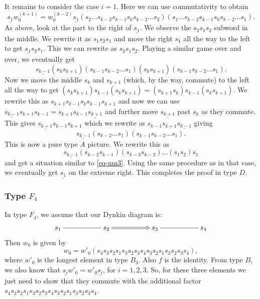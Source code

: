 \documentclass[a4paper]{amsart}
\begin{document}
It remains to consider the case $i=1$. Here we can use commutativity
to obtain 
\begin{displaymath}
\underline{s_1}w_0^{(k+1)}=
w_0^{(k-2)}\underline{s_{1}}
(s_2\dots 
s_{k-2}s_{k-1}s_ks_{k-2}\dots s_2)
(s_1\dots 
s_{k-2}s_{k-1}s_ks_{k-2}\dots s_1).
\end{displaymath}
As above, look at the part to the right of $\underline{s_{1}}$.
We observe the $s_2s_1s_2$ subword in the middle.
We rewrite it as $s_1s_2s_1$ and move the right $s_1$ all the way to the left
to get $\underline{s_{1}}s_2s_1$. This we can rewrite as
$s_2s_1\underline{s_{2}}$. Playing a similar game over and over, we
eventually get 
\begin{displaymath}
\underline{s_{k-1}}(s_ks_{k+1})(s_{k-1}s_{k-2}\dots s_1)
(s_ks_{k+1})(s_{k-1}s_{k-2}\dots s_1).
\end{displaymath}
Now we move the middle $s_k$ and $s_{k+1}$ (which, by the way, commute)
to the left all the way to get 
$(s_ks_{k+1})s_{k-1}(s_ks_{k+1})=(s_{k+1}s_k)s_{k-1}(s_ks_{k+1})$.
We rewrite this as $s_{k+1}s_{k-1}s_ks_{k-1}s_{k+1}$ and now we can use
$\underline{s_{k-1}}s_{k+1}s_{k-1}=s_{k+1}s_{k-1}\underline{s_{k+1}}$
and further move $\underline{s_{k+1}}$ past $s_k$ as they commute.
This gives $\underline{s_{k+1}}s_{k-1}s_{k+1}$ which we rewrite as
$s_{k-1}s_{k+1}\underline{s_{k-1}}$ giving
\begin{displaymath}
\underline{s_{k-1}}(s_{k-2}\dots s_1) (s_{k-1}s_{k-2}\dots s_1).
\end{displaymath}
This is now a pure type $A$ picture. We rewrite this as
\begin{displaymath}
\underline{s_{k-1}}(s_{k-2}s_{k-1})
(s_{k-3}s_{k-2}) \dots (s_1s_2)s_1
\end{displaymath}
and get a situation similar to \eqref{eq-nm3}. Using the same 
procedure as in that case, we eventually get $\underline{s_{1}}$
on the extreme right. This completes the proof in type $D$.

\subsubsection{\bf Type $F_4$}\label{s5.2.4}

In type $F_4$, we assume that our Dynkin diagram is:
\begin{displaymath}
\xymatrix{s_1\ar@{-}[rr]&&s_2\ar@{=>}[rr]&&
s_{3}\ar@{-}[rr]&&s_{4}} 
\end{displaymath}
Then $w_0$ is given by 
\begin{displaymath}
w_0=w'_0(s_4s_3s_2s_1s_3s_2s_3s_4s_3s_2s_1s_3s_2s_3s_4),
\end{displaymath}
where $w'_0$ is the longest element in type $B_3$.
Also $f$ is the identity. From type $B$, we also know that 
$\underline{s_{i}}w'_0=w'_0\underline{s_{i}}$, for $i=1,2,3$.
So, for these three elements we just need to show that they
commute with the additional factor 
$s_4s_3s_2s_1s_3s_2s_3s_4s_3s_2s_1s_3s_2s_3s_4$.
\end{document}
